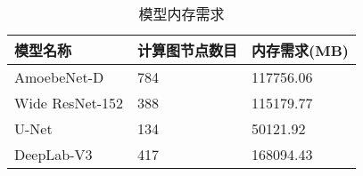 \begin{table}[h!] %
    \centering
    \caption{模型内存需求}\label{table:model}
    \begin{tabularx}{0.86\linewidth}{ p{3.5cm} p{3.5cm} X  }
        \toprule 
        \textbf{模型名称} & \textbf{计算图节点数目} & \textbf{内存需求(MB)} \\
        \midrule 
        AmoebeNet-D & 784 & 117756.06 \\
        Wide ResNet-152 & 388 & 115179.77 \\
        U-Net & 134 & 50121.92 \\
        DeepLab-V3 & 417 & 168094.43 \\
        \bottomrule
    \end{tabularx}
\end{table}